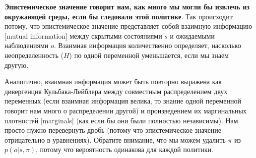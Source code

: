 \documentclass[twoside,leqno, 11pt]{article}
\begin{document}
	
	\textbf{Эпистемическое значение говорит нам, как много мы могли бы извлечь из окружающей среды, если бы следовали этой политике}. Так происходит потому, что эпистемическое значение представляет собой взаимную информацию [mutual information] между скрытыми состояниями $s$ и ожидаемыми наблюдениями $o$. Взаимная информация количественно определяет, насколько неопределенность ($H$) по одной переменной уменьшается, если мы знаем другую.
	
	
	\begin{figure}[h]
	\end{figure}
	
	Аналогично, взаимная информация может быть повторно выражена как дивергенция Кульбака-Лейблера между совместным распределением двух переменных (если взаимная информация велика, то знание одной переменной говорит нам много о распределении другой) и произведением их маргинальных плотностей [marginals] (как если бы они были полностью независимы). Нам просто нужно перевернуть дробь (потому что эпистемическое значение отрицательно в уравнениях). Обратите внимание, что мы можем удалить $\pi$ из $p(o|s,\pi)$, потому что вероятность одинакова для каждой политики.
	
	
\end{document}
